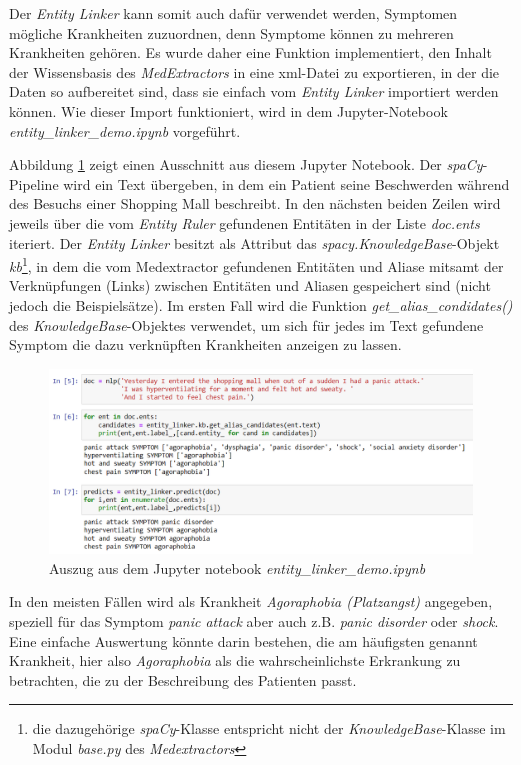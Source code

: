 Der \emph{Entity Linker} kann somit auch dafür verwendet werden, Symptomen mögliche Krankheiten zuzuordnen, denn Symptome können zu mehreren Krankheiten gehören. Es wurde daher eine Funktion implementiert, den Inhalt der Wissensbasis des \emph{MedExtractors} in eine xml-Datei zu exportieren, in der die Daten so aufbereitet sind, dass sie einfach vom \emph{Entity Linker} importiert werden können. Wie dieser Import funktioniert, wird in dem Jupyter-Notebook \emph{entity\_linker\_demo.ipynb} vorgeführt.

Abbildung \ref{fig:jupyter} zeigt einen Ausschnitt aus diesem Jupyter Notebook. Der \emph{spaCy}-Pipeline wird ein Text übergeben, in dem ein Patient seine Beschwerden während des Besuchs einer Shopping Mall beschreibt. In den nächsten beiden Zeilen wird jeweils über die vom \emph{Entity Ruler} gefundenen Entitäten in der Liste \emph{doc.ents} iteriert. Der \emph{Entity Linker} besitzt als Attribut das \emph{spacy.KnowledgeBase}-Objekt \emph{kb}\footnote{die dazugehörige \emph{spaCy}-Klasse entspricht nicht der \emph{KnowledgeBase}-Klasse im Modul \emph{base.py} des \emph{Medextractors}}, in dem die vom Medextractor gefundenen Entitäten und Aliase mitsamt der Verknüpfungen (Links) zwischen Entitäten und Aliasen gespeichert sind (nicht jedoch die Beispielsätze). Im ersten Fall wird die Funktion \emph{get\_alias\_condidates()} des \emph{KnowledgeBase}-Objektes verwendet, um sich für jedes im Text gefundene Symptom die dazu verknüpften Krankheiten anzeigen zu lassen.

\begin{figure}[h]
    \centering
    \includegraphics[width=\textwidth]{pictures/EntityLinkerDemo.png}
    \caption{Auszug aus dem Jupyter notebook \emph{entity\_linker\_demo.ipynb}}
    \label{fig:jupyter}
\end{figure}

In den meisten Fällen wird als Krankheit \emph{Agoraphobia (Platzangst)} angegeben, speziell für das Symptom \emph{panic attack} aber auch z.B. \emph{panic disorder} oder \emph{shock}. Eine einfache Auswertung könnte darin bestehen, die am häufigsten genannt Krankheit, hier also \emph{Agoraphobia} als die wahrscheinlichste Erkrankung zu betrachten, die zu der Beschreibung des Patienten passt.

